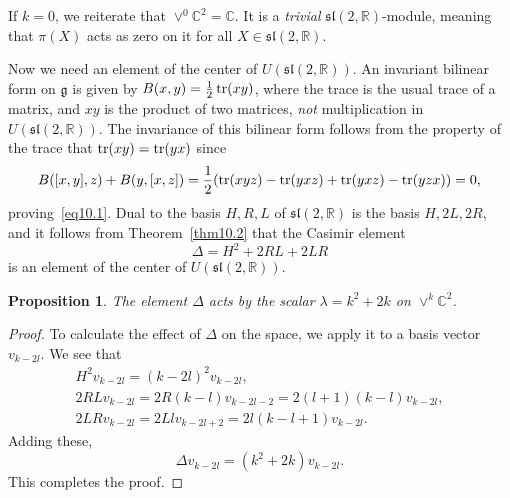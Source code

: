 \documentclass[12pt,reqno]{book}%
\newtheorem{proposition}{Proposition}[chapter]
\theoremstyle{definition}
\theoremstyle{remark}
\theoremstyle{theorem}
\theoremstyle{remark}
\begin{document}
If $k = 0$, we reiterate that $\vee^0\mathbb{C}^2 = \mathbb{C}$.
It is a \emph{trivial} $\mathfrak{sl}(2, \mathbb{R})$-module, meaning that $\pi(X)$ acts as zero on it for all $X \in \mathfrak{sl}(2, \mathbb{R})$.

Now we need an element of the center of $U(\mathfrak{sl}(2, \mathbb{R}))$.
An invariant bilinear form on $\mathfrak{g}$ is given by $B(x, y) = \frac{1}{2} \tr(xy)$, where the trace is the usual trace of a matrix, and $xy$ is the product of two matrices, \emph{not} multiplication in $U(\mathfrak{sl}(2, \mathbb{R}))$.
The invariance of this bilinear form follows from the property of the trace that $\tr(xy) = \tr(yx)$ since
\[
    B([x, y], z) + B(y, [x, z]) = \frac{1}{2}(\tr(xyz) - \tr(yxz) + \tr(yxz) - \tr(yzx)) = 0,
\]
proving~\eqref{eq10.1}.
Dual to the basis $H, R, L$ of $\mathfrak{sl}(2, \mathbb{R})$ is the basis $H, 2L, 2R$, and it follows from Theorem~\ref{thm10.2} that the Casimir element
\[
    \Delta = H^2 + 2RL + 2LR
\]
is an element of the center of $U(\mathfrak{sl}(2, \mathbb{R}))$.

\begin{proposition}\label{prop12.2}%
    The element $\Delta$ acts by the scalar $\lambda = k^2 + 2k$ on $\vee^k\mathbb{C}^2$.
\end{proposition}%
\begin{proof}%
    To calculate the effect of $\Delta$ on the space, we apply it to a basis vector $v_{k - 2l}$.
    We see that
    \begin{gather}
        H^2v_{k - 2l} = (k - 2l)^2v_{k - 2l}, \label{eq12.5} \\
        2RLv_{k - 2l} = 2R(k - l)v_{k - 2l - 2} = 2(l + 1)(k - l)v_{k - 2l}, \label{eq12.6} \\
        2LRv_{k - 2l} = 2Llv_{k - 2l + 2} = 2l(k - l + 1) v_{k - 2l}. \label{eq12.7}
    \end{gather}
    Adding these,
    \begin{equation}\label{eq12.8}
        \Delta v_{k - 2l} = (k^2 + 2k)v_{k - 2l}.
    \end{equation}
    This completes the proof.
\end{proof}%
\end{document}
